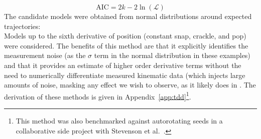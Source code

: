 \documentclass[10pt]{article}
\begin{document}
\begin{equation}
\mbox{AIC} = 2 k - 2 \ln(\mathcal{L})
\end{equation}
The candidate models were obtained from normal distributions around expected trajectories:
\begin{equation}
\end{equation}
Models up to the sixth derivative of position (constant snap, crackle, and pop) were considered.  The benefits of this method are that it explicitly identifies the measurement noise (as the $\sigma$ term in the normal distribution in these examples) and that it provides an estimate of higher order derivative terms without the need to numerically differentiate measured kinematic data (which injects large amounts of noise, masking any effect we wish to observe, as it likely does in \citep{Dial:2012}.  The derivation of these methods is given in Appendix~\ref{app:tdd}\footnote{This method was also benchmarked against autorotating seeds in a collaborative side project with Stevenson et al.\ \citep{Stevenson:2013}.}.
\end{document}
